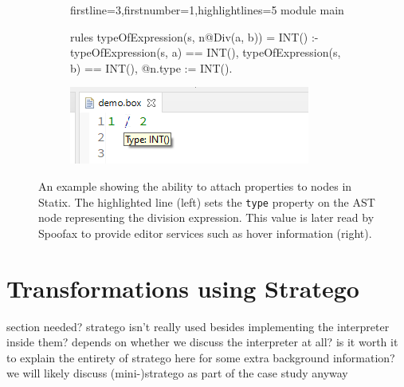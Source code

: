 \begin{figure}
  \centering
  \begin{subfigure}{.55\textwidth}
    \centering
    \begin{statix*}{firstline=3,firstnumber=1,highlightlines={5}}
module main

rules
  typeOfExpression(s, n@Div(a, b)) = INT() :-
    typeOfExpression(s, a) == INT(),
    typeOfExpression(s, b) == INT(),
    @n.type := INT().
    \end{statix*}
  \end{subfigure}\hfill%
  \begin{subfigure}{.40\textwidth}
    \centering
    \includegraphics{img/stx_hover_example.png}
  \end{subfigure}
  \caption{An example showing the ability to attach properties to nodes in Statix. The highlighted line (left) sets the \texttt{type} property on the AST node representing the division expression. This value is later read by Spoofax to provide editor services such as hover information (right).}
  \label{fig:stx_property_example}
\end{figure}

\section{\label{sec:spoofax_transform}Transformations using Stratego}

section needed? stratego isn't really used besides implementing the interpreter inside them? depends on whether we discuss the interpreter at all? is it worth it to explain the entirety of stratego here for some extra background information? we will likely discuss (mini-)stratego as part of the case study anyway
